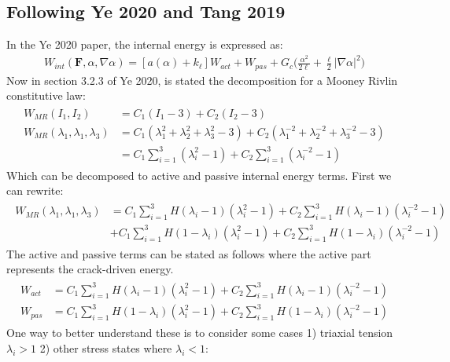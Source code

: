 \documentclass[12pt,3p]{article}
\numberwithin{equation}{section}
\begin{document}
\subsection{Following Ye 2020 and Tang 2019}
In the Ye 2020 paper, the internal energy is expressed as:
\begin{align*}
W_{int} (\mathbf{F}, \alpha, \nabla \alpha) = [a(\alpha) + k_{\ell}] W_{act} + W_{pas} + G_c \bigg( \frac{\alpha^2}{2 \ell} + \frac{\ell}{2} | \nabla \alpha|^2 \bigg) 
\end{align*}
Now in section 3.2.3 of Ye 2020, is stated the decomposition for a Mooney Rivlin constitutive law:
\begin{align*}
\begin{split}
W_{MR} (I_1, I_2) &= C_1 (I_1 - 3) + C_2 (I_2 - 3) \\
W_{MR} (\lambda_1, \lambda_1, \lambda_3) &= C_1 (\lambda_1^2 + \lambda_2^2 + \lambda_3^2 - 3) + C_2 (\lambda_1^{-2} + \lambda_2^{-2} + \lambda_3^{-2} - 3) \\
			&= C_1 \sum_{i = 1}^{3} (\lambda_i^2 - 1) + C_2 \sum_{i=1}^3 (\lambda_i^{-2} - 1) 
\end{split}
\end{align*}
Which can be decomposed to active and passive internal energy terms. First we can rewrite: 
\begin{align*}
\begin{split}
W_{MR} (\lambda_1, \lambda_1, \lambda_3) 
	&= C_1 \sum_{i = 1}^{3} H(\lambda_i - 1) (\lambda_i^2 - 1) + C_2 \sum_{i=1}^3 H(\lambda_i - 1) (\lambda_i^{-2} - 1) \\
	&+ C_1 \sum_{i = 1}^{3} H(1 - \lambda_i) (\lambda_i^2 - 1) + C_2 \sum_{i=1}^3 H(1 - \lambda_i) (\lambda_i^{-2} - 1) 
\end{split}
\end{align*}
The active and passive terms can be stated as follows where the active part represents the crack-driven energy.
\begin{align*}
\begin{split}
W_{act} &= C_1 \sum_{i = 1}^{3} H(\lambda_i - 1) (\lambda_i^2 - 1) + C_2 \sum_{i=1}^3 H(\lambda_i - 1) (\lambda_i^{-2} - 1) \\
W_{pas} &= C_1 \sum_{i = 1}^{3} H(1 - \lambda_i) (\lambda_i^2 - 1) + C_2 \sum_{i=1}^3 H(1 - \lambda_i) (\lambda_i^{-2} - 1) 
\end{split}
\end{align*}
One way to better understand these is to consider some cases 1) triaxial tension $\lambda_i > 1$ 2) other stress states where $\lambda_i < 1$:
\end{document}

